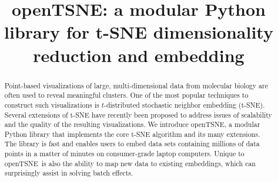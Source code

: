 \documentclass[twocolumn]{bmcart}
\newcommand{\opentsne}{\textsf{openTSNE}}
\begin{document}
\begin{frontmatter}
\begin{fmbox}

\title{openTSNE: a modular Python library for t-SNE dimensionality reduction and embedding}

\author[
  addressref={aff1},
  corref={aff1},
  email={pavlin.policar@fri.uni-lj.si}
]{ }
\author[
  addressref={aff2},
  email={martin.strazar@gmail.com}
]{ }
\author[
  addressref={aff1,aff3},
  email={martin.strazar@gmail.com}
]{ }

\address[id=aff1]{
  ,
  ,
  ,
  ,
}
\address[id=aff2]{%
  ,
  ,
  ,
}
\address[id=aff3]{%
  ,
  ,
  ,
  ,
}


\begin{abstractbox}
\begin{abstract}
Point-based visualizations of large, multi-dimensional data from molecular
biology are often used to reveal meaningful clusters. One of the most popular
techniques to construct such visualizations is $t$-distributed stochastic
neighbor embedding (t-SNE). Several extensions of t\nobreakdash-SNE have
recently been proposed to address issues of scalability and the quality
of the resulting visualizations. We introduce \opentsne, a modular
Python library that implements the core t\nobreakdash-SNE algorithm and its many
extensions.
The library is fast and enables users to embed data sets containing millions of
data points in a matter of minutes on consumer-grade laptop computers.
Unique to \opentsne\ is also the ability to map new data to existing embeddings,
which can surprisingly assist in solving batch effects.
\end{abstract}

\begin{keyword}
\end{keyword}

\end{abstractbox}

\end{fmbox}%

\end{frontmatter}
\end{document}

